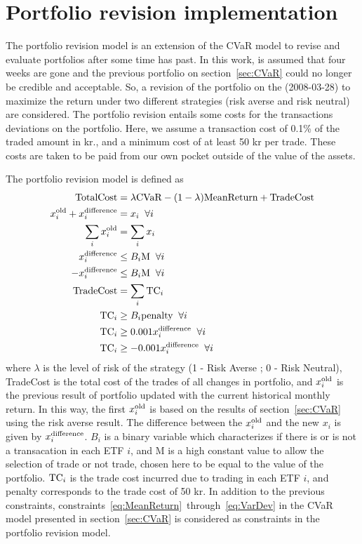 \section{Portfolio revision implementation}
The portfolio revision model is an extension of the CVaR model to revise and evaluate portfolios after some time has past.
In this work, is assumed that four weeks are gone and the previous portfolio on section~\ref{sec:CVaR} could no longer be credible and acceptable.
So, a revision of the portfolio on the (2008-03-28) to maximize the return under two different strategies (risk averse and risk neutral) are considered.
The portfolio revision entails some costs for the transactions deviations on the portfolio.
Here, we assume a transaction cost of 0.1\% of the traded amount in kr., and a minimum cost of at least 50 kr per trade.
These costs are taken to be paid from our own pocket outside of the value of the assets.

The portfolio revision model is defined as
\begin{align}
\textup{TotalCost} &= \lambda \textup{CVaR} - {\left( 1 - \lambda \right)} \textup{MeanReturn} + \textup{TradeCost} \\
x^{\textup{old}}_{i} + x^{\textup{difference}}_{i} &= x_{i} \; \; \forall i \\
\sum_{i} x^{\textup{old}}_{i} &= \sum_{i} x_{i} \\
x^{\textup{difference}}_{i} &\le B_{i} \textup{M} \; \; \forall i \\
-x^{\textup{difference}}_{i} &\le B_{i} \textup{M} \; \; \forall i \\
\textup{TradeCost} &= \sum_{i} \textup{TC}_{i} \\
\textup{TC}_{i} &\ge B_{i} \textup{penalty} \; \; \forall i \\
\textup{TC}_{i} &\ge 0.001 x^{\textup{difference}}_{i} \; \; \forall i \\
\textup{TC}_{i} &\ge - 0.001 x^{\textup{difference}}_{i} \; \; \forall i 
\end{align}
where $\lambda$ is the level of risk of the strategy (1 - Risk Averse ; 0 - Risk Neutral), TradeCost is the total cost of the trades of all changes in portfolio, and $x^{\textup{old}}_{i}$ is the previous result of portfolio updated with the current historical monthly return.
In this way, the first $x^{\textup{old}}_{i}$ is based on the results of section~\ref{sec:CVaR} using the risk averse result.
The difference between the $x^{\textup{old}}_{i}$ and the new $x_{i}$ is given by $x^{\textup{difference}}_{i}$.
$B_{i}$ is a binary variable which characterizes if there is or is not a transacation in each ETF $i$, and M is a high constant value to allow the selection of trade or not trade, chosen here to be equal to the value of the portfolio.
$\textup{TC}_{i}$ is the trade cost incurred due to trading in each ETF $i$, and penalty corresponds to the trade cost of 50 kr.
In addition to the previous constraints, constraints~\eqref{eq:MeanReturn}~through~\eqref{eq:VarDev} in the CVaR model presented in section~\ref{sec:CVaR} is considered as constraints in the portfolio revision model.

